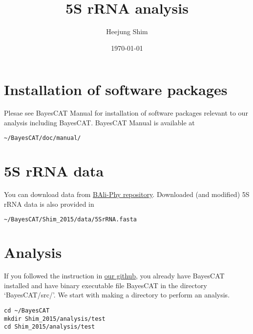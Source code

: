 \documentclass[11pt]{article}
\author{Heejung Shim}
\date{\today}
\title{5S rRNA analysis}
\begin{document}
\maketitle
\tableofcontents


\section{Installation of software packages}
\label{sec-1}
Plesae see BayesCAT Manual for installation of software packages relevant to our analysis including BayesCAT. BayesCAT Manual is available at 
\begin{lstlisting}
~/BayesCAT/doc/manual/
\end{lstlisting}

\section{5S rRNA data}
\label{sec-2}
You can download data from \href{https://github.com/bredelings/BAli-Phy/blob/master/examples/Sequences/5S-rRNA/5d.fasta}{BAli-Phy repository}. Downloaded (and modified) 5S rRNA data is also provided in 
\begin{lstlisting}
~/BayesCAT/Shim_2015/data/5SrRNA.fasta
\end{lstlisting}

\section{Analysis}
\label{sec-3}
If you followed the instruction in \href{https://github.com/heejungshim/BayesCAT}{our github}, you already have BayesCAT installed and have binary executable file BayesCAT in the directory `BayesCAT/src/'. We start with making a directory to perform an analysis.
\begin{lstlisting}
cd ~/BayesCAT
mkdir Shim_2015/analysis/test
cd Shim_2015/analysis/test
\end{lstlisting}
\end{document}
